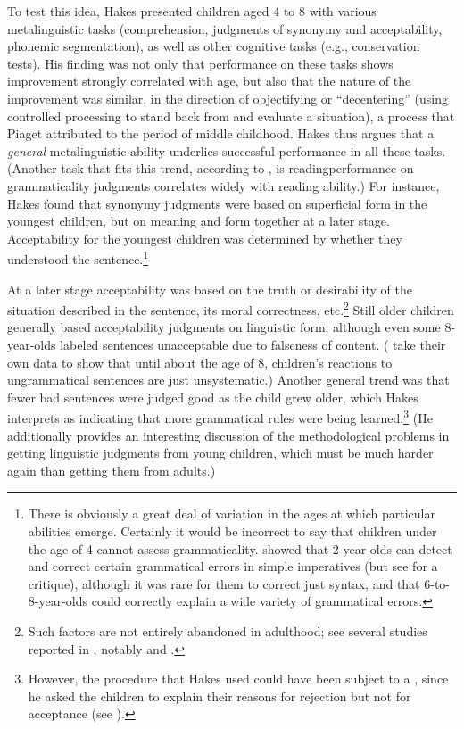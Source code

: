 To test this idea, Hakes presented children aged 4 to 8 with various metalinguistic tasks (comprehension, judgments of synonymy and acceptability, phonemic segmentation), as well as other cognitive tasks (e.g., conservation tests). His finding was not only that performance on these tasks shows improvement strongly correlated with age, but also that the nature of the improvement was similar, in the direction of objectifying or ``decentering'' (using controlled processing to stand back from and evaluate a situation), a process that Piaget attributed to the period of middle childhood. Hakes thus argues that a \textit{general} metalinguistic ability underlies successful performance in all these tasks. (Another task that fits this trend, according to \citet{RyanEtAl1984}, is reading\schdash{}performance on grammaticality
judgments correlates widely with reading ability.) For instance, Hakes found that synonymy judgments were based on superficial form in the youngest children, but on meaning and form together at a later stage. Acceptability for the youngest children was determined by whether they understood the sentence.\footnote{There is obviously a great deal of variation in the ages at which particular abilities emerge. Certainly it would be incorrect to say that children under the age of 4 cannot assess grammaticality. \citet{GleitmanEtAl1972} showed that 2\textonehalf-year-olds can detect and correct certain grammatical errors in simple imperatives (but see \citet{Gombert1992} for a critique), although it was rare for them to correct just syntax, and that 6-to-8-year-olds could correctly explain a wide variety of grammatical errors.}


 At a later stage acceptability was based on the truth or desirability of the situation described in the sentence, its moral correctness, etc.\footnote{Such factors are not entirely abandoned in adulthood; see several studies reported in , notably \citet{Hill1961} and \citet{VetterEtAl1979}.}
 Still older children generally based acceptability judgments on linguistic form, although even some 8-year-olds labeled sentences unacceptable due to falseness of  content. (\citet{RyanEtAl1984} take their own data to show that until about the age of 8, children's reactions to ungrammatical sentences are just unsystematic.) Another general trend was  that fewer bad sentences were judged good as the child grew older, which Hakes interprets as indicating that more grammatical rules were being learned.\footnote{However, the procedure that Hakes used could have been subject to a , since he asked the children to explain their reasons for rejection but not for acceptance (see ).}
(He additionally provides an interesting discussion of the methodological problems in getting linguistic judgments from young children, which must be much harder again than getting them from adults.)

